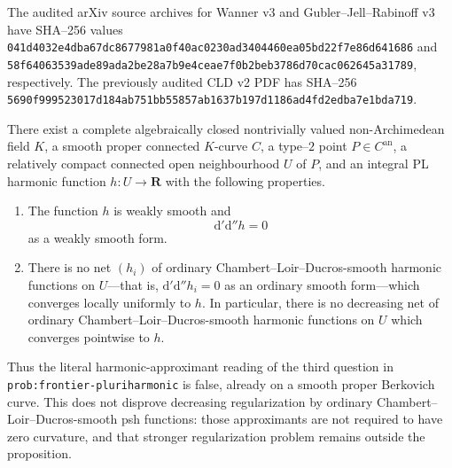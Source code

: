 The audited arXiv source archives for Wanner v3 and Gubler--Jell--Rabinoff
v3 have SHA--256 values
\texttt{041d4032e4dba67dc8677981a0f40ac0230ad3404460ea05bd22f7e86d641686}
and
\texttt{58f64063539ade89ada2be28a7b9e4ceae7f0b2beb3786d70cac062645a31789},
respectively.  The previously audited CLD v2 PDF has SHA--256
\texttt{5690f999523017d184ab751bb55857ab1637b197d1186ad4fd2edba7e1bda719}.

\begin{proposition}
There exist a complete algebraically closed nontrivially valued
non-Archimedean field $K$, a smooth proper connected $K$-curve $C$, a
type--$2$ point $P\in C^{\mathrm{an}}$, a relatively compact connected open
neighbourhood $U$ of $P$, and an integral PL harmonic function
$h:U\to\mathbf R$ with the following properties.
\begin{enumerate}
\item The function $h$ is weakly smooth and
\[
                         \mathrm d'\mathrm d''h=0
\]
as a weakly smooth form.
\item There is no net $(h_i)$ of ordinary Chambert--Loir--Ducros-smooth
harmonic functions on $U$---that is,
$\mathrm d'\mathrm d''h_i=0$ as an ordinary smooth form---which converges
locally uniformly to $h$.
In particular, there is no decreasing net of ordinary
Chambert--Loir--Ducros-smooth harmonic functions on $U$ which converges
pointwise to $h$.
\end{enumerate}
Thus the literal harmonic-approximant reading of the third question in
\textup{\texttt{prob:frontier-pluriharmonic}} is false, already on a smooth
proper Berkovich curve.  This does not disprove decreasing regularization by
ordinary Chambert--Loir--Ducros-smooth psh functions: those approximants are
not required to have zero curvature, and that stronger regularization
problem remains outside the proposition.
\end{proposition}

